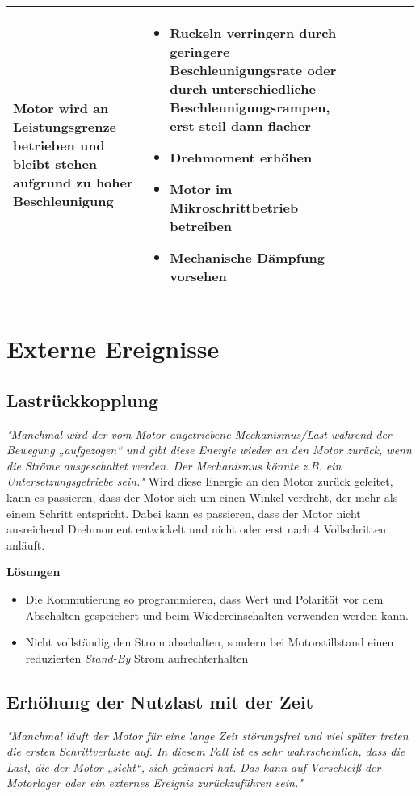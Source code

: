 {{{{\begin{center}
\begin{tabularx}{\textwidth}{|X|X|X|X|X|X|}
		Motor wird an Leistungsgrenze betrieben und bleibt stehen aufgrund zu hoher Beschleunigung & 
		\begin{itemize} 
			\item {Ruckeln verringern durch geringere Beschleunigungsrate oder durch unterschiedliche Beschleunigungsrampen, erst steil dann flacher} \item {Drehmoment erhöhen} \item {Motor im Mikroschrittbetrieb betreiben} \item {Mechanische Dämpfung vorsehen} 
		\end{itemize}	 \\	\hline
	\end{tabularx}
\end{center}



\section{Externe Ereignisse}
\subsection{Lastrückkopplung}
\textit{"Manchmal wird der vom Motor angetriebene Mechanismus/Last während der Bewegung „aufgezogen“ und gibt diese Energie wieder an den Motor zurück, wenn die Ströme ausgeschaltet werden. Der Mechanismus könnte z.B. ein Untersetzungsgetriebe sein."}\cite{FaulhaberDriveSystems.2020} 
Wird diese Energie an den Motor zurück geleitet, kann es passieren, dass der Motor sich um einen Winkel verdreht, der mehr als einem Schritt entspricht. Dabei kann es passieren, dass der Motor nicht ausreichend Drehmoment entwickelt und nicht oder erst nach 4 Vollschritten anläuft. \cite{FaulhaberDriveSystems.2020}

\textbf{Lösungen}
\begin{itemize}
	\item Die Kommutierung so programmieren, dass Wert und Polarität vor dem Abschalten gespeichert und beim Wiedereinschalten verwenden werden kann. 
	\item Nicht vollständig den Strom abschalten, sondern bei Motorstillstand einen reduzierten \textit{Stand-By} Strom aufrechterhalten
\end{itemize}

\subsection{Erhöhung der Nutzlast mit der Zeit}
\textit{"Manchmal läuft der Motor für eine lange Zeit störungsfrei und viel später treten die ersten Schrittverluste auf. In diesem Fall ist es sehr wahrscheinlich, dass die Last, die der Motor „sieht“, sich geändert hat. Das kann auf Verschleiß der Motorlager oder ein externes Ereignis zurückzuführen sein."}\cite{FaulhaberDriveSystems.2020}

}}}}

